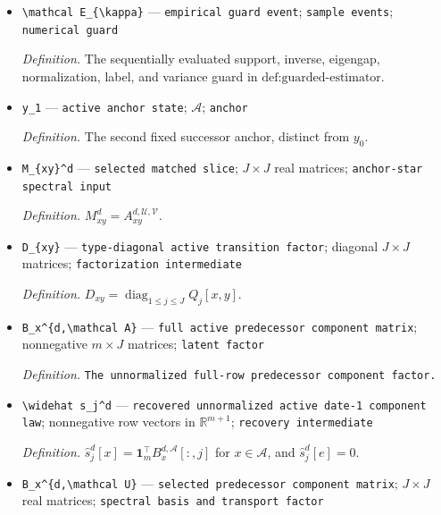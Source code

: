 \documentclass{article}
\begin{document}
\begin{itemize}
  \item \texttt{\textbackslash{}\allowbreak{}mathcal E\_\allowbreak{}\{\textbackslash{}\allowbreak{}kappa\}\allowbreak{}} --- \texttt{empirical guard event}; \texttt{sample events}; \texttt{numerical guard}
  \par\smallskip\noindent\emph{Definition.} The sequentially evaluated support, inverse, eigengap, normalization, label, and variance guard in \(\text{def:guarded-estimator}\).
  \item \texttt{y\_\allowbreak{}1} --- \texttt{active anchor state}; \(\mathcal A\); \texttt{anchor}
  \par\smallskip\noindent\emph{Definition.} The second fixed successor anchor, distinct from \(y_0\).
  \item \texttt{M\_\allowbreak{}\{xy\}\allowbreak{}\textasciicircum{}d} --- \texttt{selected matched slice}; \(J\times J\) real matrices; \texttt{anchor-\allowbreak{}star spectral input}
  \par\smallskip\noindent\emph{Definition.} \(M_{xy}^d=A_{xy}^{d,\mathcal U,\mathcal V}\).
  \item \texttt{D\_\allowbreak{}\{xy\}\allowbreak{}} --- \texttt{type-\allowbreak{}diagonal active transition factor}; diagonal \(J\times J\) matrices; \texttt{factorization intermediate}
  \par\smallskip\noindent\emph{Definition.} \(D_{xy}=\operatorname{diag}_{1\leq j\leq J}Q_j[x,y]\).
  \item \texttt{B\_\allowbreak{}x\textasciicircum{}\{d,\allowbreak{}\textbackslash{}\allowbreak{}mathcal A\}\allowbreak{}} --- \texttt{full active predecessor component matrix}; nonnegative \(m\times J\) matrices; \texttt{latent factor}
  \par\smallskip\noindent\emph{Definition.} \texttt{The unnormalized full-\allowbreak{}row predecessor component factor.}
  \item \texttt{\textbackslash{}\allowbreak{}widehat s\_\allowbreak{}j\textasciicircum{}d} --- \texttt{recovered unnormalized active date-\allowbreak{}1 component law}; nonnegative row vectors in \(\mathbb R^{m+1}\); \texttt{recovery intermediate}
  \par\smallskip\noindent\emph{Definition.} \(\widehat s_j^d[x]=\mathbf1_m^\top B_x^{d,\mathcal A}[:,j]\) for \(x\in\mathcal A\), and \(\widehat s_j^d[e]=0\).
  \item \texttt{B\_\allowbreak{}x\textasciicircum{}\{d,\allowbreak{}\textbackslash{}\allowbreak{}mathcal U\}\allowbreak{}} --- \texttt{selected predecessor component matrix}; \(J\times J\) real matrices; \texttt{spectral basis and transport factor}

\end{itemize}
\end{document}
